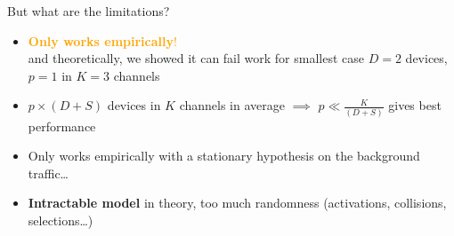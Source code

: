 \begin{frameO}

    \begin{lightblock}{But what are the limitations?}

        \begin{itemize}
            \setlength\itemsep{5pt}
            \item
                \textcolor{orange}{\textbf{Only works empirically}!}
                \\
                and theoretically, we showed it can fail work for smallest case $D = 2$ devices, $p=1$ in $K=3$ channels
            \item
                $p \times (D + S)$ devices in $K$ channels in average
                $\implies$ $p \ll \frac{K}{(D + S)}$ gives best performance
            \item
                Only works empirically with a stationary hypothesis on the background traffic\dots
            \item
                \textbf{Intractable model} in theory, too much randomness (activations, collisions, selections\dots)
        \end{itemize}

    \end{lightblock}

\end{frameO}
